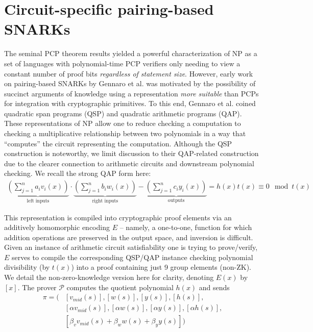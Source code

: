 \section{Circuit-specific pairing-based SNARKs}
\noindent The seminal PCP theorem results \cite{pcpthm1, pcpthm2} yielded a powerful characterization of NP as a set of languages with polynomial-time PCP verifiers only needing to view a constant number of proof bits \textit{regardless of statement size}. However, early work on pairing-based SNARKs by Gennaro et al. \cite{snarknopcp} was motivated by the possibility of succinct arguments of knowledge using a representation \textit{more suitable} than PCPs for integration with cryptographic primitives. To this end, Gennaro et al. \cite{snarknopcp} coined quadratic span programs (QSP) and quadratic arithmetic programs (QAP). These representations of NP allow one to reduce checking a computation to checking a multiplicative relationship between two polynomials in a way that ``computes'' the circuit representing the computation. Although the QSP construction is noteworthy, we limit discussion to their QAP-related construction due to the clearer connection to arithmetic circuits and downstream polynomial checking. We recall the strong QAP form here:
\begin{align}
\underbrace{\left(\sum_{j=1}^n a_i v_i(x)\right)}_{\text{left inputs}} \cdot \underbrace{\left(\sum_{j=1}^n b_i w_i(x)\right)}_{\text{right inputs}} - \underbrace{\left(\sum_{j=1}^n c_i y_i(x)\right)}_{\text{outputs}} = h(x) t(x) \equiv 0 \mod t(x)
\end{align}

\noindent This representation is compiled into cryptographic proof elements via an additively homomorphic encoding $E$ -- namely, a one-to-one, function for which addition operations are preserved in the output space, and inversion is difficult. Given an instance of arithmetic circuit satisfiability one is trying to prove/verify, $E$ serves to compile the corresponding QSP/QAP instance checking polynomial divisibility (by $t(x)$) into a proof containing just 9 group elements (non-ZK). We detail the non-zero-knowledge version here for clarity, denoting $E(x)$ by $[x]$. The prover $\mathcal{P}$ computes the quotient polynomial $h(x)$ and sends
\begin{align}
    \pi = \Big(&[v_{mid}(s)], [w(s)], [y(s)], [h(s)], \\ 
    &[\alpha v_{mid}(s)], [\alpha w(s)], [\alpha y(s)], [\alpha h(s)], \\ 
    &[\beta_v v_{mid}(s) + \beta_w w(s) + \beta_y y(s)]\Big)
\end{align}

